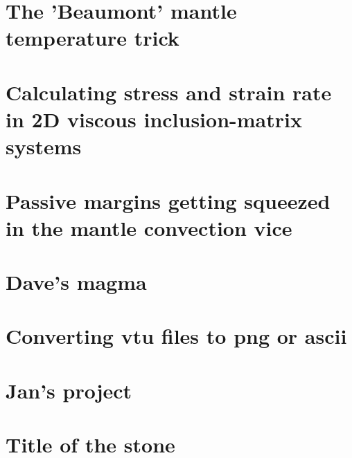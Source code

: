 \documentclass[a4paper,11pt]{report}
\begin{document}
\chapter{The 'Beaumont' mantle temperature trick \label{f141}} %

\chapter{Calculating stress and strain rate in 2D viscous inclusion-matrix systems \label{f142}} %

\chapter{Passive margins getting squeezed in the mantle convection vice \label{f143}} %

\chapter{Dave's magma \label{f144}} %

\chapter{Converting vtu files to png or ascii \label{f145}} %

\chapter{Jan's project \label{f146}} %

\chapter{Title of the stone}
\end{document}

